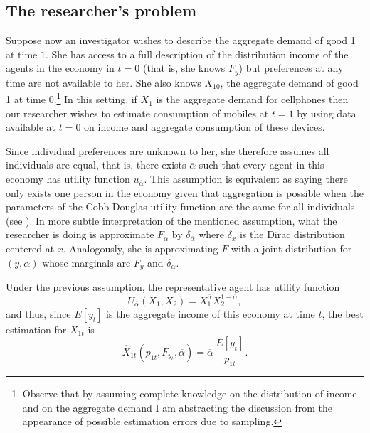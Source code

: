 \documentclass[english, a4paper,12pt]{article}
\begin{document}
\subsection{The researcher's problem} \label{ssec:RepAgProblem}
Suppose now an investigator wishes to describe the aggregate demand of good 1 at time $1$. She has access to a full description of the distribution income of the agents in the economy in $t = 0$ (that is, she knows $F_{y}$) but preferences at any time are not available to her. She also knows $X_{10}$, the aggregate demand of good 1 at time $0$.\footnote{Observe that by assuming complete knowledge on the distribution of income and on the aggregate demand I am abstracting the discussion from the appearance of possible estimation errors due to sampling.} In this setting, if $X_{1}$ is the aggregate demand for cellphones then our researcher wishes to estimate consumption of mobiles at $t=1$ by using data available at $t=0$ on income and aggregate consumption of these devices.

Since individual preferences are unknown to her, she therefore assumes all individuals are equal, that is, there exists $\overline{\alpha}$ such that every agent in this economy has utility function $u_{\overline{\alpha}}$. This assumption is equivalent as saying there only exists one person in the economy given that aggregation is possible when the parameters of the Cobb-Douglas utility function are the same for all individuals (see ). In more subtle interpretation of the mentioned assumption, what the researcher is doing is approximate $F_{\alpha}$ by $\delta_{\overline{\alpha}}$ where $\delta_{x}$ is the Dirac distribution centered at $x$. Analogously, she is approximating $F$ with a joint distribution for $(y,\alpha)$ whose marginals are $F_{y}$ and $\delta_{\overline{\alpha}}$.

Under the previous assumption, the representative agent has utility function
	$$U_{\overline{\alpha}}(X_{1}, X_{2}) = X_{1}^{\overline{\alpha}}X_{2}^{1-\overline{\alpha}},$$
and thus, since $E[y_{t}]$ is the aggregate income of this economy at time $t$, the best estimation for $X_{1t}$ is
	$$\widehat{X}_{1t}(p_{1t}, F_{y_{t}}, \overline{\alpha}) = \overline{\alpha}\, \frac{E[y_{t}]}{p_{1t}}.$$

\end{document}
